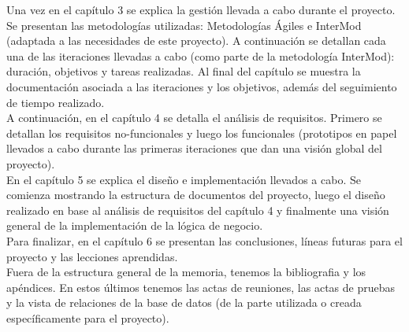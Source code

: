 Una vez en el capítulo 3 se explica la gestión llevada a cabo durante el proyecto. Se presentan las metodologías utilizadas: Metodologías Ágiles e InterMod (adaptada a las necesidades de este proyecto). A continuación se detallan cada una de las iteraciones llevadas a cabo (como parte de la metodología InterMod): duración, objetivos y tareas realizadas. Al final del capítulo se muestra la documentación asociada a las iteraciones y los objetivos, además del seguimiento de tiempo realizado.\\

A continuación, en el capítulo 4 se detalla el análisis de requisitos. Primero se detallan los requisitos no-funcionales y luego los funcionales (prototipos en papel llevados a cabo durante las primeras iteraciones que dan una visión global del proyecto).\\

En el capítulo 5 se explica el diseño e implementación llevados a cabo. Se comienza mostrando la estructura de documentos del proyecto, luego el diseño realizado en base al análisis de requisitos del capítulo 4 y finalmente una visión general de la implementación de la lógica de negocio.\\

Para finalizar, en el capítulo 6 se presentan las conclusiones, líneas futuras para el proyecto y las lecciones aprendidas.\\

Fuera de la estructura general de la memoria, tenemos la bibliografia y los apéndices. En estos últimos tenemos las actas de reuniones, las actas de pruebas y la vista de relaciones de la base de datos (de la parte utilizada o creada específicamente para el proyecto).\\